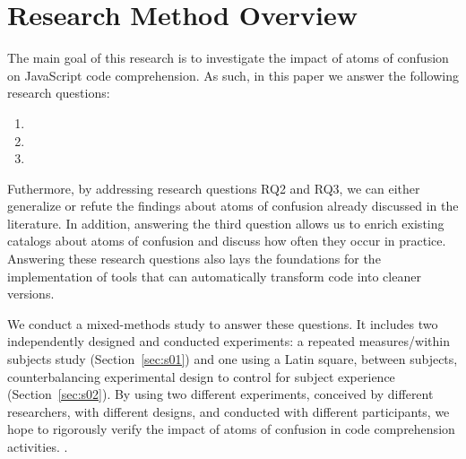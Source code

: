 \section{Research Method Overview}
\label{method}

The main goal of this research is to investigate the impact of atoms of confusion on JavaScript code comprehension. As such, in this paper we answer the following research questions: 

\begin{enumerate}[(RQ1)]
\item \revised{\rqd}
\item \rqa 
\item \rqb
\end{enumerate}

Futhermore, by addressing research questions RQ2 and RQ3, we can either generalize or refute the findings about atoms of confusion already discussed in the literature. 
In addition, answering the third question allows us to enrich existing catalogs about atoms of confusion and discuss how often they occur in practice. Answering these research questions also lays the foundations for the implementation of tools that can automatically transform code into cleaner versions.

We conduct a mixed-methods study to answer these questions. 
It includes two independently designed and conducted experiments: a repeated measures/within subjects study (Section~\ref{sec:s01}) and one using a Latin square, between subjects, counterbalancing experimental design to control for subject experience (Section~\ref{sec:s02}). By using two different experiments, conceived by different researchers, with different designs, and conducted with different participants, we hope to rigorously verify the impact of atoms of confusion in code comprehension activities. .

